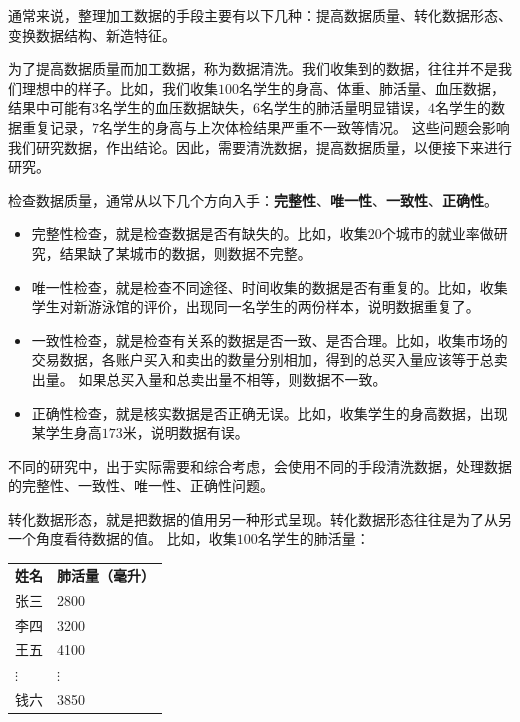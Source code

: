 \documentclass[12pt,UTF8]{ctexbook}
\begin{document}
通常来说，整理加工数据的手段主要有以下几种：提高数据质量、转化数据形态、变换数据结构、新造特征。

为了提高数据质量而加工数据，称为数据清洗。我们收集到的数据，往往并不是我们理想中的样子。比如，我们收集$100$名学生的身高、体重、肺活量、血压数据，
结果中可能有$3$名学生的血压数据缺失，$6$名学生的肺活量明显错误，$4$名学生的数据重复记录，$7$名学生的身高与上次体检结果严重不一致等情况。
这些问题会影响我们研究数据，作出结论。因此，需要清洗数据，提高数据质量，以便接下来进行研究。

检查数据质量，通常从以下几个方向入手：\textbf{完整性}、\textbf{唯一性}、\textbf{一致性}、\textbf{正确性}。
\begin{itemize}
    \item 完整性检查，就是检查数据是否有缺失的。比如，收集$20$个城市的就业率做研究，结果缺了某城市的数据，则数据不完整。
    \item 唯一性检查，就是检查不同途径、时间收集的数据是否有重复的。比如，收集学生对新游泳馆的评价，出现同一名学生的两份样本，说明数据重复了。
    \item 一致性检查，就是检查有关系的数据是否一致、是否合理。比如，收集市场的交易数据，各账户买入和卖出的数量分别相加，得到的总买入量应该等于总卖出量。
    如果总买入量和总卖出量不相等，则数据不一致。
    \item 正确性检查，就是核实数据是否正确无误。比如，收集学生的身高数据，出现某学生身高$173$米，说明数据有误。
\end{itemize}
不同的研究中，出于实际需要和综合考虑，会使用不同的手段清洗数据，处理数据的完整性、一致性、唯一性、正确性问题。

转化数据形态，就是把数据的值用另一种形式呈现。转化数据形态往往是为了从另一个角度看待数据的值。
比如，收集$100$名学生的肺活量：
\begin{center}
    \begin{tabular}{ p{3em}<{\centering} !{\color{white} \vrule width 2pt} p{7em}<{\centering} }
         \textbf{姓名} & \textbf{肺活量（毫升）} \\ [0.5ex] 
         张三 & 2800 \\  
         李四 & 3200 \\
         王五 & 4100 \\  
         $\vdots$ & $\vdots$ \\  
         钱六 & 3850 \\
    \end{tabular}
\end{center}
\end{document}
